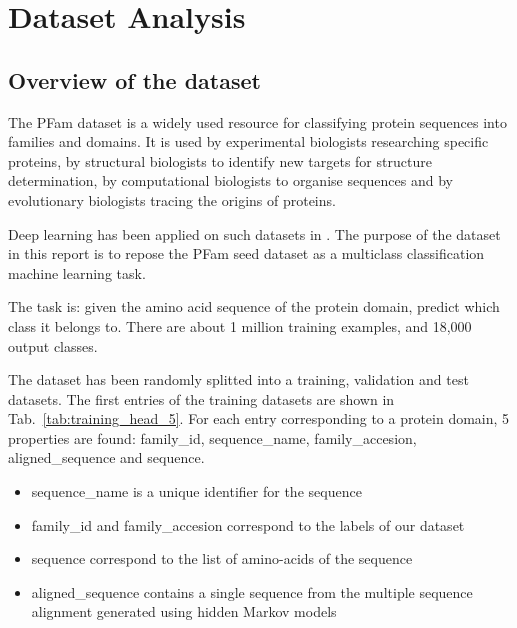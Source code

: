 \documentclass[12pt]{article}
\begin{document}
\maketitle


\section{Dataset Analysis}

\subsection{Overview of the dataset}

The PFam dataset \cite{Mistry2020} is a widely used resource for classifying protein sequences into families and domains. It is used by experimental biologists researching specific proteins, by structural biologists to identify new targets for structure determination, by computational biologists to organise sequences and by evolutionary biologists tracing the origins of proteins.

Deep learning has been applied on such datasets in \cite{Bileschi2022}. The purpose of the dataset in this report is to repose the PFam seed dataset as a multiclass classification machine learning task.

The task is: given the amino acid sequence of the protein domain, predict which class it belongs to. There are about 1 million training examples, and 18,000 output classes.

The dataset has been randomly splitted into a training, validation and test datasets. The first entries of the training datasets are shown in Tab.~\ref{tab:training_head_5}. For each entry corresponding to a protein domain, 5 properties are found: family\_id, sequence\_name, family\_accesion, aligned\_sequence and sequence.

\begin{itemize}
    \item sequence\_name is a unique identifier for the sequence
    \item family\_id and family\_accesion correspond to the labels of our dataset
    \item sequence correspond to the list of amino-acids of the sequence
    \item aligned\_sequence contains a single sequence from the multiple sequence alignment generated using hidden Markov models \citep{Finn_2007}
\end{itemize}
\end{document}
